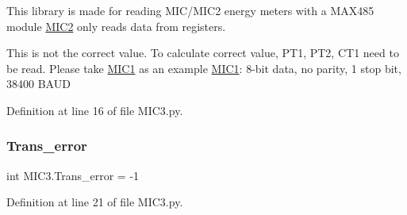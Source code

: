 This library is made for reading M\+I\+C/\+M\+I\+C2 energy meters with a M\+A\+X485 module \hyperlink{class_m_i_c3_1_1_m_i_c2}{M\+I\+C2} only reads data from registers. 

This is not the correct value. To calculate correct value, P\+T1, P\+T2, C\+T1 need to be read. Please take \hyperlink{class_m_i_c3_1_1_m_i_c1}{M\+I\+C1} as an example \hyperlink{class_m_i_c3_1_1_m_i_c1}{M\+I\+C1}\+: 8-\/bit data, no parity, 1 stop bit, 38400 B\+A\+UD 

Definition at line 16 of file M\+I\+C3.\+py.

\mbox{\label{namespace_m_i_c3_a1fbc497007a26c1b2dbea6d293611157}} 
\subsubsection{\texorpdfstring{Trans\+\_\+error}{Trans\_error}}
{\footnotesize\ttfamily int M\+I\+C3.\+Trans\+\_\+error = -\/1}



Definition at line 21 of file M\+I\+C3.\+py.

